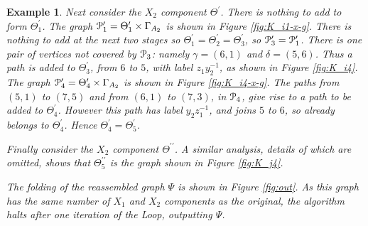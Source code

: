 \documentclass[a4paper,12pt]{article}
\newcommand{\G}{\Gamma }
\newcommand{\g}{\gamma }
\renewcommand{\d}{\delta }
\newcommand{\T}{\Theta }
\newcommand{\cP}{{\cal{P}}}
\newtheorem{exam}[theorem]{Example}
\newenvironment{example}{\begin{exam} \rm}{\end{exam}}
\numberwithin{equation}{section}
\numberwithin{figure}{section}
\begin{document}
\begin{example}
Next consider the $X_2$ component $\T^\prime$. There is nothing to
add to form $\T^\prime_1$. The graph $\cP_1^\prime=\T_1^\prime
\times \G_{A_2}$ is shown in Figure \ref{fig:K_i1-x-g}. There is
nothing to add at the next two  stages so
$\T_1^\prime=\T_2^\prime=\T_3^\prime$, so
$\cP_3^\prime=\cP_1^\prime$. There is one pair of vertices not
covered by $\cP_3$: namely $\g=(6,1)$ and $\d=(5,6)$. Thus a path
is added to $\T_3^\prime$, from $6$ to $5$, with label
$z_1y_2^{-1}$, as shown in Figure \ref{fig:K_i4}. The graph
 $\cP_4^\prime=\T_4^\prime \times \G_{A_2}$ is shown in Figure \ref{fig:K_i4-x-g}. The paths
from $(5,1)$ to $(7,5)$ and from $(6,1)$ to $(7,3)$, in $\cP_4$, give rise to a path to be
added to $\T_4^\prime$. However this path has label $y_2z_1^{-1}$, and joins $5$ to $6$, so already
belongs to $\T_4^\prime$. Hence $\T_4^\prime=\T_5^\prime$.

Finally consider the $X_2$ component $\T^{\prime\prime}$. A similar analysis, details of which
are omitted, shows that $ \T^{\prime\prime}_5$ is the graph shown in Figure \ref{fig:K_j4}.

The folding of the reassembled graph $\Psi$ is shown in  Figure
\ref{fig:out}.  As this graph has the same number of $X_1$ and $X_2$ components as the original,
the algorithm halts after one iteration of the Loop, outputting $\Psi$.

\end{example}
\end{document}
